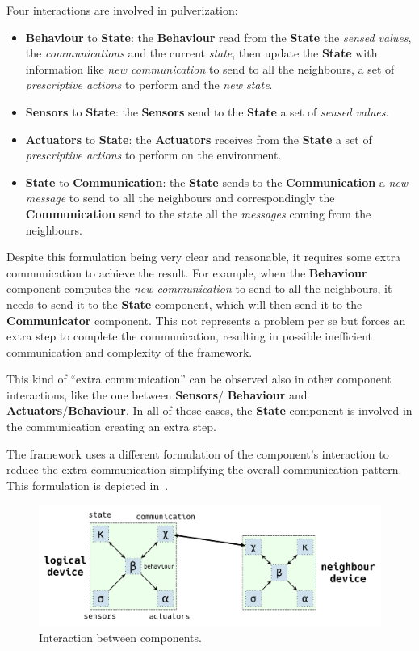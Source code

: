 Four interactions are involved in pulverization:
\begin{itemize}
	\item \textbf{Behaviour} to \textbf{State}: the \textbf{Behaviour} read from the \textbf{State} the \textit{sensed values}, the \textit
	      {communications} and the current \textit{state}, then update the \textbf{State} with information like \textit{new communication} to send to
	      all the neighbours, a set of \textit{prescriptive actions} to perform and the \textit{new state}.
	\item \textbf{Sensors} to \textbf{State}: the \textbf{Sensors} send to the \textbf{State} a set of \textit{sensed values}.
	\item \textbf{Actuators} to \textbf{State}: the \textbf{Actuators} receives from the \textbf{State} a set of \textit{prescriptive actions} to
	      perform on the environment.
	\item \textbf{State} to \textbf{Communication}: the \textbf{State} sends to the \textbf{Communication} a \textit{new message}
	      to send to all the neighbours and correspondingly the \textbf{Communication} send to the state all the \textit{messages} coming from the
	      neighbours.
\end{itemize}

Despite this formulation being very clear and reasonable, it requires some extra communication to achieve the result.
For example, when the \textbf{Behaviour} component computes the \textit{new communication} to send to all the neighbours, it needs to send it to the
\textbf{State} component, which will then send it to the \textbf{Communicator} component. This not represents a problem per se but forces an extra
step to complete the communication, resulting in possible inefficient communication and complexity of the framework.

This kind of ``extra communication'' can be observed also in other component interactions, like the one between \textbf{Sensors}/
\textbf{Behaviour} and \textbf{Actuators}/\textbf{Behaviour}. In all of those cases, the \textbf{State} component is involved in the
communication creating an extra step.

The framework uses a different formulation of the component's interaction to reduce the extra communication simplifying the overall communication
pattern. This formulation is depicted in~.

\begin{figure}
	\centering
	\includegraphics[width=\textwidth]{figures/framework-components-interactions.pdf}
	\caption{Interaction between components.}
	\label{fig:framework-components-interaction-2}
\end{figure}

